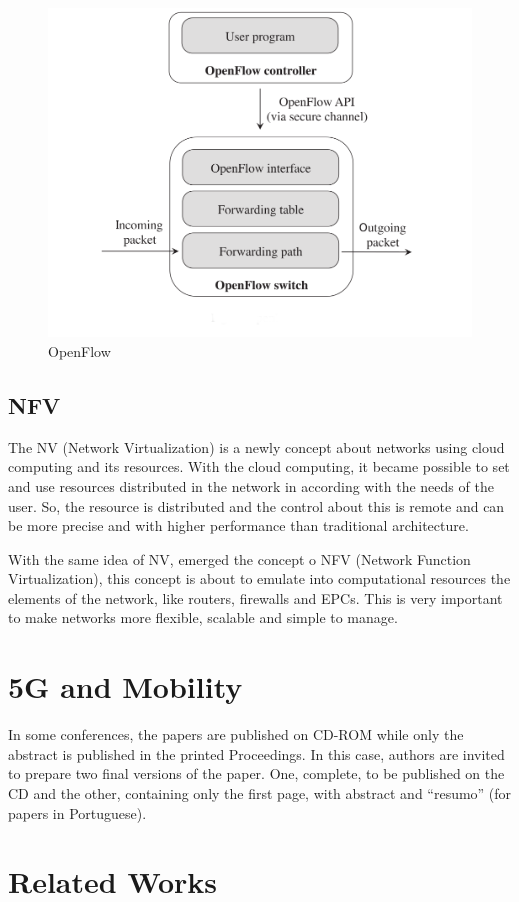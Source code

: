 \documentclass[12pt]{article}
\begin{document}
\begin{figure}[ht]
\centering
\includegraphics[width=.7\textwidth]{figure3.png}
\caption{OpenFlow}
\label{figure 3: OpenFlow}
\end{figure}


\subsection{NFV}

The NV (Network Virtualization) is a newly concept about networks using cloud computing and its resources. With the cloud computing, it became possible to set and use resources distributed in the network in according with the needs of the user. So, the resource is distributed and the control about this is remote and can be more precise and with higher performance than traditional architecture.

With the same idea of NV, emerged the concept o NFV (Network Function Virtualization), this concept is about to emulate into computational resources the elements of the network, like routers, firewalls and EPCs. This is very important to make networks more flexible, scalable and simple to manage.


\section{5G and Mobility}

In some conferences, the papers are published on CD-ROM while only the
abstract is published in the printed Proceedings. In this case, authors are
invited to prepare two final versions of the paper. One, complete, to be
published on the CD and the other, containing only the first page, with
abstract and ``resumo'' (for papers in Portuguese).

\section{Related Works}
\end{document}
